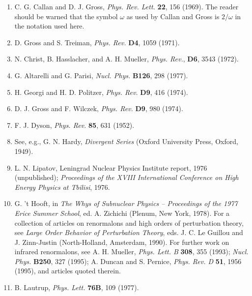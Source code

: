 \begin{enumerate}
\item {}\label{ch20-ref-12}
C. G. Callan and D. J. Gross, \emph{Phys. Rev. Lett.} \textbf{22}, 156 (1969). The reader should be warned that the symbol $\omega$ as used by Callan and Gross is $2/\omega$ in the notation used here.

\item {}\label{ch20-ref-13}
D. Gross and S. Treiman, \emph{Phys. Rev.} \textbf{D4}, 1059 (1971).

\item {}\label{ch20-ref-14}
N. Christ, B. Hasslacher, and A. H. Mueller, \emph{Phys. Rev.}, \textbf{D6}, 3543 (1972).

\item {}\label{ch20-ref-15}
G. Altarelli and G. Parisi, \emph{Nucl. Phys.} \textbf{B126}, 298 (1977).

\item {}\label{ch20-ref-16}
H. Georgi and H. D. Politzer, \emph{Phys. Rev.} \textbf{D9}, 416 (1974).

\item {}\label{ch20-ref-17}
D. J. Gross and F. Wilczek, \emph{Phys. Rev.} \textbf{D9}, 980 (1974).

\item {}\label{ch20-ref-18}
F. J. Dyson, \emph{Phys. Rev.} \textbf{85}, 631 (1952).

\item {}\label{ch20-ref-19}
See, e.g., G. N. Hardy, \emph{Divergent Series} (Oxford University Press, Oxford, 1949).

\item {}\label{ch20-ref-20}
L. N. Lipatov, Leningrad Nuclear Physics Institute report, 1976 (unpublished); \emph{Proceedings of the XVIII International Conference on High Energy Physics at Tbilisi}, 1976.

\item {}\label{ch20-ref-21}
G. 't Hooft, in \emph{The Whys of Subnuclear Physics -- Proceedings of the 1977 Erice Summer School}, ed. A. Zichichi (Plenum, New York, 1978). For a collection of articles on renormalons and high orders of perturbation theory, see \emph{Large Order Behavior of Perturbation Theory}, eds. J. C. Le Guillou and J. Zinn-Justin (North-Holland, Amsterdam, 1990). For further work on infrared renormalons, see A. H. Mueller, \emph{Phys. Lett. B} \textbf{308}, 355 (1993); \emph{Nucl. Phys.} \textbf{B250}, 327 (1995); A. Duncan and S. Pernice, \emph{Phys. Rev. D} \textbf{51}, 1956 (1995), and articles quoted therein.

\item {}\label{ch20-ref-22}
B. Lautrup, \emph{Phys. Lett.} \textbf{76B}, 109 (1977).
\end{enumerate}
